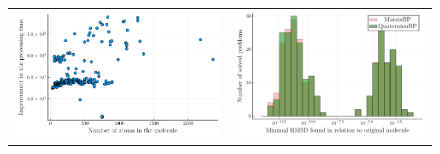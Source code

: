 \documentclass[a4paper,11pt]{article}
\begin{document}
\begin{figure}[H]
\begin{tabular}{cc}
			\includegraphics[scale=0.55]{figures/improvAll.pdf}& 
			\includegraphics[scale=0.55]{figures/histogramRMSDAll.pdf} \\
		\end{tabular}
		\label{fig:mean}
	\end{figure}
\end{document}

